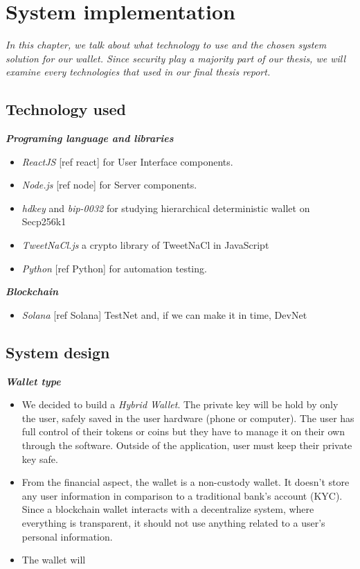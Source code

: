 \chapter{System implementation} \label{chap:System_implementation}
\textit{In this chapter, we talk about what technology to use and the chosen system solution for our wallet. Since security play a majority part of our thesis, we will examine every technologies that used in our final thesis report.}
\minitoc

\section{Technology used}
{\textit {\textbf{Programing language and libraries}}}
\begin{itemize}
\item \emph{ReactJS} [ref react] for User Interface components. 
\item \emph{Node.js} [ref node] for Server components.
\item \emph{hdkey} and \emph{bip-0032} for studying hierarchical deterministic wallet on Secp256k1
\item \emph{TweetNaCl.js} a crypto library of TweetNaCl in JavaScript
\item \emph{Python} [ref Python] for automation testing.
\end{itemize}

{\textit {\textbf{Blockchain}}}
\begin{itemize}
    \item \emph{Solana} [ref Solana] TestNet and, if we can make it in time, DevNet
\end{itemize}

\section{System design}
{\textit {\textbf{Wallet type}}}
\begin{itemize}
    \item We decided to build a \emph{Hybrid Wallet}. The private key will be hold by only the user, safely saved in the user hardware (phone or computer). The user has full control of their tokens or coins but they have to manage it on their own through the software. Outside of the application, user must keep their private key safe.
    \item From the financial aspect, the wallet is a non-custody wallet. It doesn't store any user information in comparison to a traditional bank's account (KYC). Since a blockchain wallet interacts with a decentralize system, where everything is transparent, it should not use anything related to a user's personal information.
    \item The wallet will
\end{itemize}

